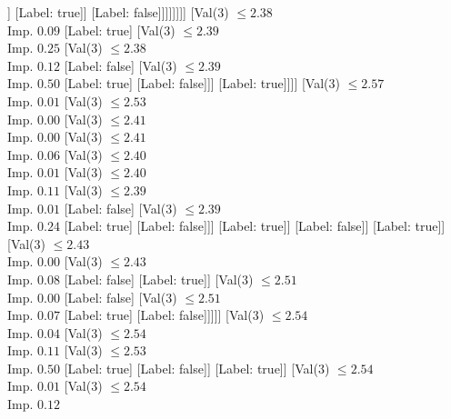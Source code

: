 \documentclass[margin=10pt]{standalone}
\begin{document}
\begin{forest}
																	[Val($3$) $ \leq 2.37$ \\ Imp. $0.50$
																		[Label: true]
																		[Label: false]]
																	[Label: true]]
																[Label: false]]]]]]]]
									[Val($3$) $ \leq 2.38$ \\ Imp. $0.09$
										[Label: true]
										[Val($3$) $ \leq 2.39$ \\ Imp. $0.25$
											[Val($3$) $ \leq 2.38$ \\ Imp. $0.12$
												[Label: false]
												[Val($3$) $ \leq 2.39$ \\ Imp. $0.50$
													[Label: true]
													[Label: false]]]
											[Label: true]]]]
								[Val($3$) $ \leq 2.57$ \\ Imp. $0.01$
									[Val($3$) $ \leq 2.53$ \\ Imp. $0.00$
										[Val($3$) $ \leq 2.41$ \\ Imp. $0.00$
											[Val($3$) $ \leq 2.41$ \\ Imp. $0.06$
												[Val($3$) $ \leq 2.40$ \\ Imp. $0.01$
													[Val($3$) $ \leq 2.40$ \\ Imp. $0.11$
														[Val($3$) $ \leq 2.39$ \\ Imp. $0.01$
															[Label: false]
															[Val($3$) $ \leq 2.39$ \\ Imp. $0.24$
																[Label: true]
																[Label: false]]]
														[Label: true]]
													[Label: false]]
												[Label: true]]
											[Val($3$) $ \leq 2.43$ \\ Imp. $0.00$
												[Val($3$) $ \leq 2.43$ \\ Imp. $0.08$
													[Label: false]
													[Label: true]]
												[Val($3$) $ \leq 2.51$ \\ Imp. $0.00$
													[Label: false]
													[Val($3$) $ \leq 2.51$ \\ Imp. $0.07$
														[Label: true]
														[Label: false]]]]]
										[Val($3$) $ \leq 2.54$ \\ Imp. $0.04$
											[Val($3$) $ \leq 2.54$ \\ Imp. $0.11$
												[Val($3$) $ \leq 2.53$ \\ Imp. $0.50$
													[Label: true]
													[Label: false]]
												[Label: true]]
											[Val($3$) $ \leq 2.54$ \\ Imp. $0.01$
												[Val($3$) $ \leq 2.54$ \\ Imp. $0.12$

\end{forest}
\end{document}
